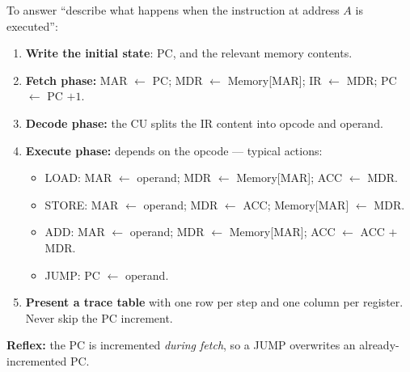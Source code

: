 \documentclass[11pt]{article}
\begin{document}
\begin{methode}
To answer ``describe what happens when the instruction at address $A$ is executed'':
\begin{enumerate}
\item \textbf{Write the initial state}: PC, and the relevant memory contents.
\item \textbf{Fetch phase:} MAR $\leftarrow$ PC; MDR $\leftarrow$ Memory[MAR]; IR $\leftarrow$ MDR; PC $\leftarrow$ PC $+1$.
\item \textbf{Decode phase:} the CU splits the IR content into opcode and operand.
\item \textbf{Execute phase:} depends on the opcode — typical actions:
\begin{itemize}
\item LOAD: MAR $\leftarrow$ operand; MDR $\leftarrow$ Memory[MAR]; ACC $\leftarrow$ MDR.
\item STORE: MAR $\leftarrow$ operand; MDR $\leftarrow$ ACC; Memory[MAR] $\leftarrow$ MDR.
\item ADD: MAR $\leftarrow$ operand; MDR $\leftarrow$ Memory[MAR]; ACC $\leftarrow$ ACC $+$ MDR.
\item JUMP: PC $\leftarrow$ operand.
\end{itemize}
\item \textbf{Present a trace table} with one row per step and one column per register. Never skip the PC increment.
\end{enumerate}
\textbf{Reflex:} the PC is incremented \emph{during fetch}, so a JUMP overwrites an already-incremented PC.
\end{methode}
\end{document}
